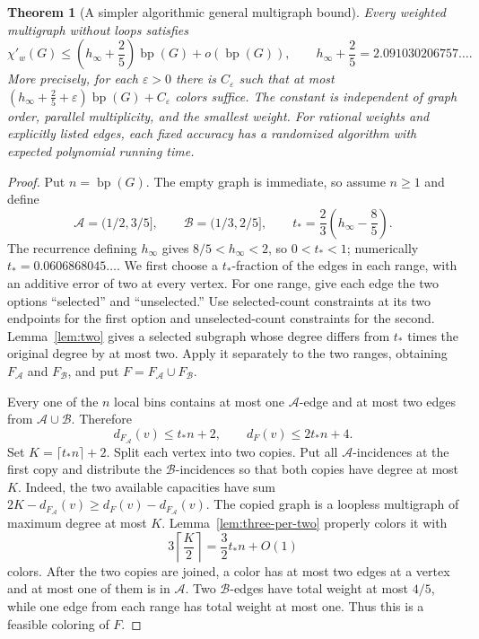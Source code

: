 \documentclass[11pt]{article}
\newtheorem{theorem}{Theorem}[section]
\theoremstyle{definition}\newtheorem{algorithm}{Algorithm}[section]
\numberwithin{equation}{section}
\theoremstyle{remark}\newtheorem*{remark}{Remark}
\newcommand{\bp}{\operatorname{bp}}
\begin{document}
\begin{theorem}[A simpler algorithmic general multigraph bound]
\label{thm:general-bp-improved}
Every weighted multigraph without loops satisfies
\[
 \chi'_w(G)\le
 \left(h_\infty+\frac25\right)\bp(G)+o(\bp(G)),
 \qquad h_\infty+\frac25=2.091030206757\ldots.
\]
More precisely, for each $\varepsilon>0$ there is $C_\varepsilon$ such
that at most
$\left(h_\infty+\frac25+\varepsilon\right)\bp(G)+C_\varepsilon$
colors suffice.  The constant is independent of graph order, parallel
multiplicity, and the smallest weight.  For rational weights and
explicitly listed edges, each fixed accuracy has a randomized algorithm
with expected polynomial running time.
\end{theorem}
\begin{proof}
Put $n=\bp(G)$.  The empty graph is immediate, so assume $n\ge1$ and
define
\[
 \mathcal A=(1/2,3/5],\qquad
 \mathcal B=(1/3,2/5],\qquad
 t_* =\frac23\left(h_\infty-\frac85\right).
\]
The recurrence defining $h_\infty$ gives $8/5<h_\infty<2$, so
$0<t_*<1$; numerically $t_*=0.0606868045\ldots$.  We first choose a
$t_*$-fraction of
the edges in each range, with an additive error of two at every vertex.
For one range, give each edge the two options ``selected'' and
``unselected.''  Use selected-count constraints at its two endpoints
for the first option and unselected-count constraints for the second.
Lemma~\ref{lem:two} gives a selected subgraph whose degree differs from
$t_*$ times the original degree by at most two.  Apply it separately to
the two ranges, obtaining $F_{\mathcal A}$ and $F_{\mathcal B}$, and put
$F=F_{\mathcal A}\cup F_{\mathcal B}$.

Every one of the $n$ local bins contains at most one $\mathcal A$-edge
and at most two edges from $\mathcal A\cup\mathcal B$.  Therefore
\[
 d_{F_{\mathcal A}}(v)\le t_*n+2,
 \qquad d_F(v)\le2t_*n+4.
\]
Set $K=\lceil t_*n\rceil+2$.  Split each vertex into two copies.  Put
all $\mathcal A$-incidences at the first copy and distribute the
$\mathcal B$-incidences so that both copies have degree at most $K$.
Indeed, the two available capacities have sum
$2K-d_{F_{\mathcal A}}(v)\ge d_F(v)-d_{F_{\mathcal A}}(v)$.
The copied graph is a loopless multigraph of maximum degree at most $K$.
Lemma~\ref{lem:three-per-two} properly colors it with
\[
 3\left\lceil\frac K2\right\rceil
   =\frac32t_*n+O(1)
\]
colors.  After the two copies are joined, a color has at most two edges
at a vertex and at most one of them is in $\mathcal A$.  Two
$\mathcal B$-edges have total weight at most $4/5$, while one edge from
each range has total weight at most one.  Thus this is a feasible
coloring of $F$.


\end{proof}
\end{document}
